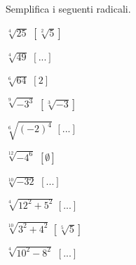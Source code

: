\begin{esercizio}[\Ast]
 \label{ese:2.24}
Semplifica i seguenti radicali.
\vspace{-.5em}
 \begin{multicols}{3}
 \begin{enumeratea}
 \item $\sqrt[4]{25}$ \hfill $\left[\sqrt[2]{5}\right]$
 \item $\sqrt[4]{49}$
  \hfill $\left[...\right]$
 \item $\sqrt[6]{64}$
  \hfill $\left[2\right]$
%  
 \item $\sqrt[9]{-3^3}$
  \hfill $\left[\sqrt[3]{-3}\right]$
 \item $\sqrt[6]{(-2)^4}$
  \hfill $\left[...\right]$
 \item $\sqrt[12]{-4^6}$
  \hfill $\left[\emptyset\right]$
 \item $\sqrt[10]{-32}$
  \hfill $\left[...\right]$
 \item $\sqrt[4]{12^2+5^2}$
  \hfill $\left[...\right]$
 \item $\sqrt[10]{3^2+4^2}$
  \hfill $\left[\sqrt[5]5\right]$
 \item $\sqrt[4]{10^2-8^2}$
  \hfill $\left[...\right]$

\end{enumeratea}
\end{multicols}
\end{esercizio}
